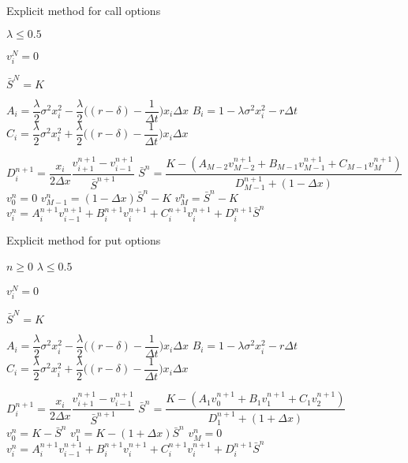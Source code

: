 \begin{algorithm}
  \caption{Explicit method for call options} \label{alg:cap}
  \begin{algorithmic}
  \Ensure $\lambda \le 0.5$
  
    \State $v^{N}_i = 0 $
  \EndFor
  
  \State $\bar{S}^{N} = K$

    \State $A_i = \dfrac{\lambda}{2}\sigma^2x^{2}_i - \dfrac{\lambda}{2}\bigg((r-\delta) - \dfrac{1}{\Delta{t}}\bigg)x_i\Delta{x}$
    \State $B_i = 1 - \lambda\sigma^2x_i^2 - r\Delta{t} $
    \State $C_i = \dfrac{\lambda}{2}\sigma^2x^{2}_i + \dfrac{\lambda}{2}\bigg((r-\delta) - \dfrac{1}{\Delta{t}}\bigg)x_i\Delta{x} $
  \EndFor
  
      \State $D^{n+1}_i = \dfrac{x_i}{2\Delta{x}}\dfrac{v^{n+1}_{i+1} - v^{n+1}_{i-1}}{\bar{S}^{n+1}}$
    \EndFor
    \State $\bar{S}^n = \dfrac{K - (A_{M-2}v^{n+1}_{M-2} + B_{M-1}v^{n+1}_{M-1} + C_{M-1}v^{n+1}_{M})}{D^{n+1}_{M-1} + (1-\Delta{x})}$
    \State $v^{n}_{0} = 0$
    \State $v^{n}_{M-1} = (1-\Delta{x})\bar{S}^{n} - K$
    \State $v^{n}_{M} = \bar{S}^{n} - K$
      \State $v^{n}_{i} = A^{n+1}_i v^{n+1}_{i-1} + B^{n+1}_{i}v^{n+1}_{i} + C^{n+1}_{i}v^{n+1}_{i} + D^{n+1}_{i}\bar{S}^n$
    \EndFor
  \EndFor
\end{algorithmic}
\end{algorithm}

\newpage

\begin{algorithm}[H]
  \caption{Explicit method for put options}\label{alg:cap}
  \begin{algorithmic}
  \Require $n \geq 0$
  \Ensure $\lambda \le 0.5$
  
    \State $v^{N}_i = 0 $
  \EndFor
  
  \State $\bar{S}^{N} = K$

    \State $A_i = \dfrac{\lambda}{2}\sigma^2x^{2}_i - \dfrac{\lambda}{2}\bigg((r-\delta) - \dfrac{1}{\Delta{t}}\bigg)x_i\Delta{x}$
    \State $B_i = 1 - \lambda\sigma^2x_i^2 - r\Delta{t} $
    \State $C_i = \dfrac{\lambda}{2}\sigma^2x^{2}_i + \dfrac{\lambda}{2}\bigg((r-\delta) - \dfrac{1}{\Delta{t}}\bigg)x_i\Delta{x} $
  \EndFor
  
      \State $D^{n+1}_i = \dfrac{x_i}{2\Delta{x}}\dfrac{v^{n+1}_{i+1} - v^{n+1}_{i-1}}{\bar{S}^{n+1}}$
    \EndFor
    \State $\bar{S}^n = \dfrac{K - (A_{1}v^{n+1}_{0} + B_{1}v^{n+1}_{1} + C_{1}v^{n+1}_{2})}{D^{n+1}_{1} + (1+\Delta{x})}$
    \State $v^{n}_{0} = K - \bar{S}^{n}$
    \State $v^{n}_{1} = K - (1+\Delta{x})\bar{S}^n$
    \State $v^{n}_{M} = 0$
      \State $v^{n}_{i} = A^{n+1}_i v^{n+1}_{i-1} + B^{n+1}_{i}v^{n+1}_{i} + C^{n+1}_{i}v^{n+1}_{i} + D^{n+1}_{i}\bar{S}^n$
    \EndFor
  \EndFor
\end{algorithmic}
\end{algorithm}

